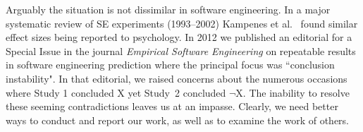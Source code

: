 \documentclass[preprint,10pt]{elsarticle}
\begin{document}
Arguably the situation is not  dissimilar in software engineering.  In a major systematic review of SE experiments (1993--2002) Kampenes et al.~\cite{Kamp07} found similar effect sizes being reported to psychology. In 2012 we published an editorial for a Special Issue in the journal \textit{Empirical Software Engineering} on repeatable results in software engineering prediction \cite{menzies12} where the principal focus was ``conclusion instability".  In that editorial, we raised concerns about the numerous occasions where Study 1 concluded X yet Study~2 concluded $\neg$X.  The inability to resolve these seeming contradictions leaves us at an impasse.  Clearly, we need better ways to conduct and report our work, as well as to examine the work of others.


\end{document}
